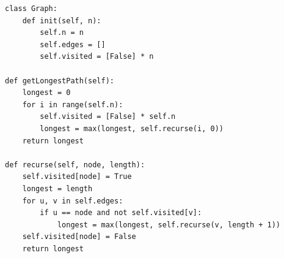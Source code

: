 \documentclass[12pt,letterpaper]{article}
\begin{document}
\begin{enumerate}
    \begin{lstlisting}[style = Python]
class Graph:
    def init(self, n):
        self.n = n
        self.edges = []
        self.visited = [False] * n

def getLongestPath(self):
    longest = 0
    for i in range(self.n):
        self.visited = [False] * self.n
        longest = max(longest, self.recurse(i, 0))
    return longest

def recurse(self, node, length):
    self.visited[node] = True
    longest = length
    for u, v in self.edges:
        if u == node and not self.visited[v]:
            longest = max(longest, self.recurse(v, length + 1))
    self.visited[node] = False
    return longest
    \end{lstlisting}

\end{enumerate}
\end{document}
